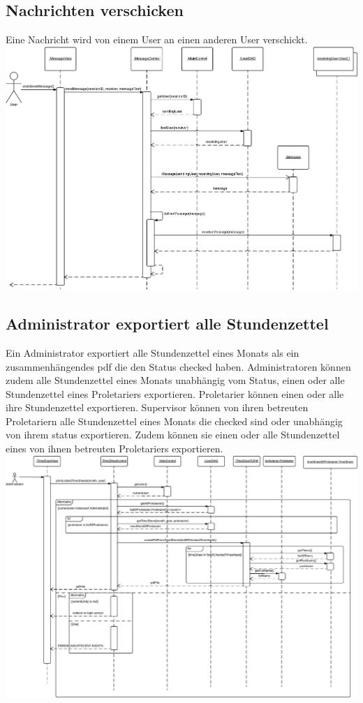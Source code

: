     \newpage
    \subsection{Nachrichten verschicken}
        Eine Nachricht wird von einem User an einen anderen User verschickt.\\

        \includegraphics[width=\linewidth]{Diagramms/sequenzes/message_delivery.pdf}

    \newpage
    \subsection{Administrator exportiert alle Stundenzettel}
        Ein Administrator exportiert alle Stundenzettel eines Monats als ein zusammenhängendes pdf die den Status checked haben.
        Administratoren können zudem alle Stundenzettel eines Monats unabhängig vom Status, einen oder alle Stundenzettel eines Proletariers exportieren.
        Proletarier können einen oder alle ihre Stundenzettel exportieren.
        Supervisor können von ihren betreuten Proletariern alle Stundenzettel eines Monats die checked sind oder unabhängig von ihrem status exportieren.
        Zudem können sie einen oder alle Stundenzettel eines von ihnen betreuten Proletariers exportieren.\\

        \includegraphics[width=\linewidth]{Diagramms/sequenzes/admin_prints_timesheets.pdf}

